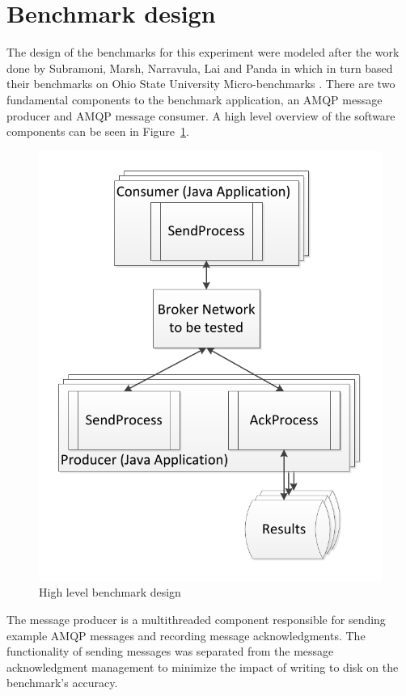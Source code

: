 \documentclass{thesis}
\begin{document}
\section{Benchmark design}
The design of the benchmarks for this experiment were modeled after the work done by Subramoni, Marsh, Narravula, Lai and Panda in \cite{subramoni2008design} which in turn based their benchmarks on Ohio State University Micro-benchmarks \cite{OSU_MICRO_BENCHMARKS}.  There are two fundamental components to the benchmark application, an AMQP message producer and AMQP message consumer.  A high level overview of the software components can be seen in Figure~\ref{benchmark-design}.  

\begin{figure}[ht]
\centering
\includegraphics[scale=.70]{benchmark_design}  
\caption{High level benchmark design}
\label{benchmark-design}
\end{figure}

The message producer is a multithreaded component responsible for sending example AMQP messages and recording message acknowledgments.  The functionality of sending messages was separated from the message acknowledgment management to minimize the impact of writing to disk on the benchmark's accuracy.  
\end{document}
